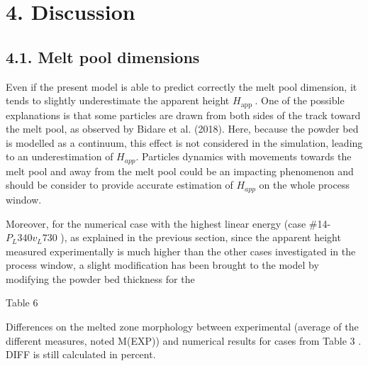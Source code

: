 \documentclass[10pt]{article}
\begin{document}
\section*{4. Discussion}
\subsection*{4.1. Melt pool dimensions}
Even if the present model is able to predict correctly the melt pool dimension, it tends to slightly underestimate the apparent height $H_{\text {app }}$. One of the possible explanations is that some particles are drawn from both sides of the track toward the melt pool, as observed by Bidare et al. (2018). Here, because the powder bed is modelled as a continuum, this effect is not considered in the simulation, leading to an underestimation of $H_{a p p}$. Particles dynamics with movements towards the melt pool and away from the melt pool could be an impacting phenomenon and should be consider to provide accurate estimation of $H_{a p p}$ on the whole process window.

Moreover, for the numerical case with the highest linear energy (case \#14- $P_{L} 340 v_{L} 730$ ), as explained in the previous section, since the apparent height measured experimentally is much higher than the other cases investigated in the process window, a slight modification has been brought to the model by modifying the powder bed thickness for the

Table 6

Differences on the melted zone morphology between experimental (average of the different measures, noted M(EXP)) and numerical results for cases from Table 3 . DIFF is still calculated in percent.
\end{document}
